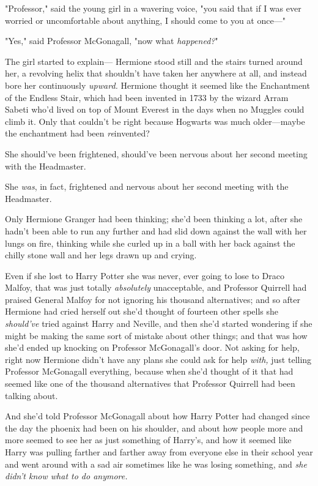 "Professor," said the young girl in a wavering voice, "you said that if I was
ever worried or uncomfortable about anything, I should come to you at once---"

"Yes," said Professor McGonagall, "now what \emph{happened?}"

The girl started to explain---
\later
Hermione stood still and the stairs turned around her, a revolving helix that
shouldn't have taken her anywhere at all, and instead bore her continuously
\emph{upward.} Hermione thought it seemed like the Enchantment of the Endless
Stair, which had been invented in 1733 by the wizard Arram Sabeti who'd lived
on top of Mount Everest in the days when no Muggles could climb it. Only that
couldn't be right because Hogwarts was much older---maybe the enchantment had
been \emph{re}invented?

She should've been frightened, should've been nervous about her second meeting
with the Headmaster.

She \emph{was}, in fact, frightened and nervous about her second meeting with
the Headmaster.

Only Hermione Granger had been thinking; she'd been thinking a lot, after she
hadn't been able to run any further and had slid down against the wall with her
lungs on fire, thinking while she curled up in a ball with her back against the
chilly stone wall and her legs drawn up and crying.

Even if she lost to Harry Potter she was never, ever going to lose to Draco
Malfoy, that was just totally \emph{absolutely} unacceptable, and Professor
Quirrell had praised General Malfoy for not ignoring his thousand alternatives;
and so after Hermione had cried herself out she'd thought of fourteen other
spells she \emph{should've} tried against Harry and Neville, and then she'd
started wondering if she might be making the same sort of mistake about other
things; and that was how she'd ended up knocking on Professor McGonagall's
door. Not asking for help, right now Hermione didn't have any plans she could
ask for help \emph{with,} just telling Professor McGonagall everything, because
when she'd thought of it that had seemed like one of the thousand alternatives
that Professor Quirrell had been talking about.

And she'd told Professor McGonagall about how Harry Potter had changed since
the day the phoenix had been on his shoulder, and about how people more and
more seemed to see her as just something of Harry's, and how it seemed like
Harry was pulling farther and farther away from everyone else in their school
year and went around with a sad air sometimes like he was losing something, and
\emph{she didn't know what to do anymore.}

